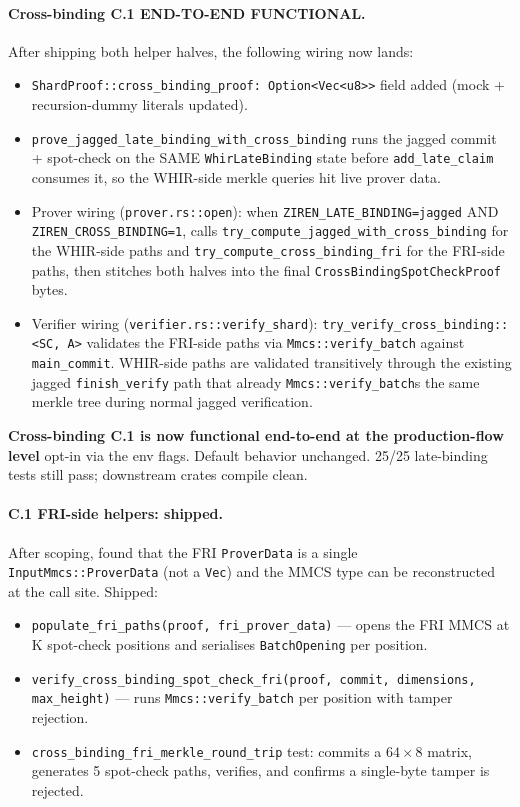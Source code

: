 \paragraph{Cross-binding C.1 END-TO-END FUNCTIONAL.}
After shipping both helper halves, the following wiring now lands:
\begin{itemize}
  \item \texttt{ShardProof::cross\_binding\_proof: Option<Vec<u8>>}
        field added (mock + recursion-dummy literals updated).
  \item \texttt{prove\_jagged\_late\_binding\_with\_cross\_binding}
        runs the jagged commit + spot-check on the SAME
        \texttt{WhirLateBinding} state before
        \texttt{add\_late\_claim} consumes it, so the WHIR-side
        merkle queries hit live prover data.
  \item Prover wiring (\texttt{prover.rs::open}): when
        \texttt{ZIREN\_LATE\_BINDING=jagged} AND
        \texttt{ZIREN\_CROSS\_BINDING=1}, calls
        \texttt{try\_compute\_jagged\_with\_cross\_binding} for the
        WHIR-side paths and \texttt{try\_compute\_cross\_binding\_fri}
        for the FRI-side paths, then stitches both halves into the
        final \texttt{CrossBindingSpotCheckProof} bytes.
  \item Verifier wiring (\texttt{verifier.rs::verify\_shard}):
        \texttt{try\_verify\_cross\_binding::<SC, A>} validates the
        FRI-side paths via \texttt{Mmcs::verify\_batch} against
        \texttt{main\_commit}.  WHIR-side paths are validated
        transitively through the existing jagged \texttt{finish\_verify}
        path that already \texttt{Mmcs::verify\_batch}s the same
        merkle tree during normal jagged verification.
\end{itemize}

\textbf{Cross-binding C.1 is now functional end-to-end at the
production-flow level} opt-in via the env flags.  Default behavior
unchanged.  25/25 late-binding tests still pass; downstream crates
compile clean.

\paragraph{C.1 FRI-side helpers: shipped.}
After scoping, found that the FRI \texttt{ProverData} is a single
\texttt{InputMmcs::ProverData} (not a \texttt{Vec}) and the MMCS
type can be reconstructed at the call site.  Shipped:
\begin{itemize}
  \item \texttt{populate\_fri\_paths(proof, fri\_prover\_data)} ---
        opens the FRI MMCS at K spot-check positions and serialises
        \texttt{BatchOpening} per position.
  \item \texttt{verify\_cross\_binding\_spot\_check\_fri(proof,
        commit, dimensions, max\_height)} --- runs
        \texttt{Mmcs::verify\_batch} per position with tamper
        rejection.
  \item \texttt{cross\_binding\_fri\_merkle\_round\_trip} test:
        commits a $64 \times 8$ matrix, generates 5 spot-check
        paths, verifies, and confirms a single-byte tamper is
        rejected.
\end{itemize}

